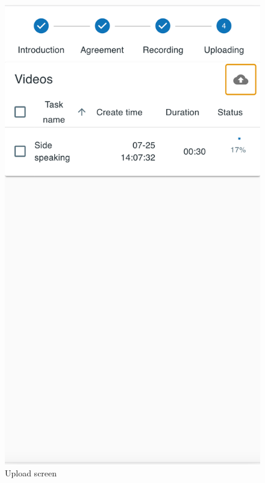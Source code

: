 \begin{minipage}{.5\textwidth}
\begin{figure}[H]
    \centering
    \includegraphics[width=\textwidth]{appendix/imgs/web-upload.png}
    \caption{Upload screen}
    \label{fig:web-upload}
\end{figure}
\end{minipage}

\clearpage
